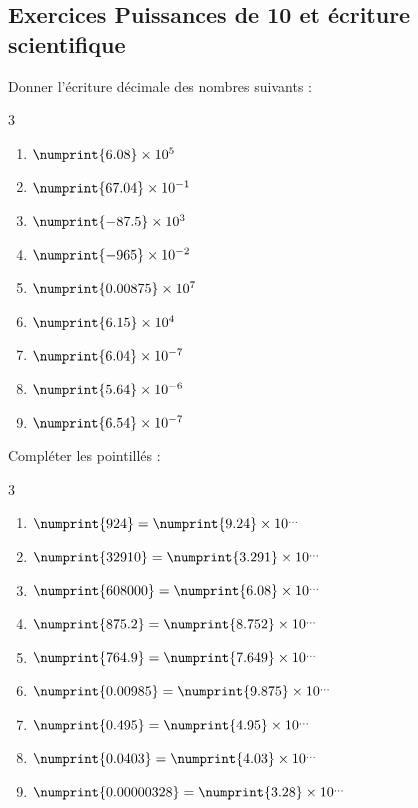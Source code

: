 \documentclass[main.tex]{subfiles}
\begin{document}
\subsection{Exercices Puissances de 10 et écriture scientifique}
\begin{exercise} 
	Donner l'écriture décimale des nombres suivants :
	\begin{multicols}{3}
		\begin{enumerate}[label=\alph*),leftmargin=*]
			\item $\numprint{6.08}\times 10^5$
			\item $\numprint{67.04}\times 10^{-1}$
			\item $\numprint{-87.5}\times 10^3$
			\item $\numprint{-965}\times 10^{-2}$
			\item $\numprint{0.00875}\times 10^7$
			\item $\numprint{6.15}\times 10^4$
			\item $\numprint{6.04}\times 10^{-7} $ 
			\item $\numprint{5.64}\times 10^{-6} $
			\item $	\numprint{6.54}\times 10^{-7} $
		\end{enumerate}
	\end{multicols}
\end{exercise} 
\begin{exercise} 
	Compléter les pointillés :
	\begin{multicols}{3}
		\begin{enumerate}[label={\alph*)},leftmargin=*]
			\item $\numprint{924} = \numprint{9.24}\times 10^{\ldots}$
			\item $\numprint{32910} = \numprint{3.291}\times 10^{\ldots}$
			\item $\numprint{608000} = \numprint{6.08}\times 10^{\ldots}$
			\item $\numprint{875.2} = \numprint{8.752}\times 10^{\ldots}$
			\item $\numprint{764.9} = \numprint{7.649}\times 10^{\ldots}$
			\item $\numprint{0.00985} = \numprint{9.875}\times 10^{\ldots}$ 
			\item $\numprint{0.495} = \numprint{4.95}\times 10^{\ldots}$
			\item $\numprint{0.0403} = \numprint{4.03}\times 10^{\ldots}$
			\item $\numprint{0.00000328} = \numprint{3.28}\times 10^{\ldots}$
		\end{enumerate}
	\end{multicols}
\end{exercise}
\end{document}
